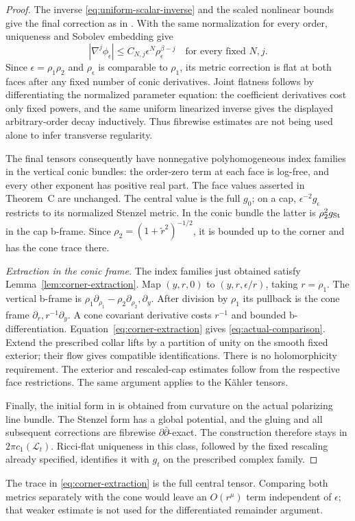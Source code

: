 \begin{proof}
The inverse \eqref{eq:uniform-scalar-inverse} and the scaled nonlinear
bounds give the final correction as in \cite[\S7]{benabida}. With the
same normalization for every order, uniqueness and Sobolev embedding give
\[
 |\nabla^j\phi_\epsilon|\le C_{N,j}\epsilon^N
                           \rho_\epsilon^{\beta-j}
 \quad\text{for every fixed }N,j.
\]
Since $\epsilon=\rho_1\rho_2$ and $\rho_\epsilon$ is comparable to
$\rho_1$, its metric correction is flat at both faces after any fixed
number of conic derivatives. Joint flatness follows by differentiating
the normalized parameter equation: the coefficient derivatives cost only
fixed powers, and the same uniform linearized inverse gives the displayed
arbitrary-order decay inductively. Thus fibrewise estimates are not being
used alone to infer transverse regularity.

The final tensors consequently have nonnegative polyhomogeneous index
families in the vertical conic bundles: the order-zero term at each face
is log-free, and every other exponent has positive real part. The face
values asserted in Theorem~C are unchanged. The central value is the full
$g_0$; on a cap, $\epsilon^{-2}g_\epsilon$ restricts to its normalized
Stenzel metric. In the conic bundle the latter is
$\rho_2^2g_{\rm St}$ in the cap b-frame. Since
$\rho_2=(1+\widetilde r^2)^{-1/2}$, it is bounded up to the corner
and has the cone trace there.

\emph{Extraction in the conic frame.}
The index families just obtained satisfy Lemma~\ref{lem:corner-extraction}.
Map $(y,r,0)$ to $(y,r,\epsilon/r)$, taking $r=\rho_1$. The vertical
b-frame is $\rho_1\partial_{\rho_1}-\rho_2\partial_{\rho_2},\partial_y$.
After division by $\rho_1$ its pullback is the cone frame
$\partial_r,r^{-1}\partial_y$. A cone covariant derivative costs $r^{-1}$
and bounded b-differentiation. Equation~\eqref{eq:corner-extraction} gives
\eqref{eq:actual-comparison}. Extend the prescribed collar lifts by a
partition of unity on the smooth fixed exterior; their flow gives compatible
identifications. There is no holomorphicity requirement. The exterior and
rescaled-cap estimates follow from the respective face restrictions. The
same argument applies to the K\"ahler tensors.

Finally, the initial form in \cite[Proposition~5.9]{benabida} is obtained
from curvature on the actual polarizing line bundle. The Stenzel form has
a global potential, and the gluing and all subsequent corrections are
fibrewise $\partial\bar\partial$-exact. The construction therefore stays
in $2\pi c_1(\mathcal L_t)$. Ricci-flat uniqueness in this class, followed
by the fixed rescaling already specified, identifies it with $g_t$ on the
prescribed complex family.
\end{proof}

The trace in \eqref{eq:corner-extraction} is the full central tensor.
Comparing both metrics separately with the cone would leave an
$O(r^\mu)$ term independent of $\epsilon$; that weaker estimate is not
used for the differentiated remainder argument.
